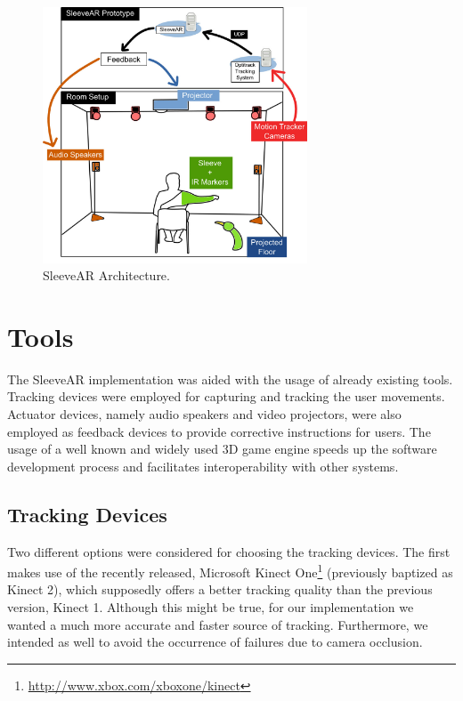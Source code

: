 \begin{figure}[!t]
    \begin{center}
        \includegraphics[width=0.7\textwidth]{imgs/impl/arch}
    \end{center}
    \caption{SleeveAR Architecture.}
    \label{fig:arch}
\end{figure}




\section{Tools}
\label{sec:impl:tools}

The SleeveAR implementation was aided with the usage of already existing tools. Tracking devices were employed for capturing and tracking the user movements. Actuator devices, namely audio speakers and video projectors, were also employed as feedback devices to provide corrective instructions for users. The usage of a well known and widely used 3D game engine speeds up the software development process and facilitates interoperability with other systems.

\subsection{Tracking Devices}
\label{sec:impl:trackdevices}

Two different options were considered for choosing the tracking devices.
The first makes use of the recently released, Microsoft Kinect One\footnote{\url{http://www.xbox.com/xboxone/kinect}} 
(previously baptized as Kinect 2), which supposedly offers a better tracking quality than 
the previous version, Kinect 1. Although this might be true, for our implementation we wanted a much more accurate and faster source of tracking. Furthermore, we intended as well to avoid the occurrence of failures due to camera occlusion.

